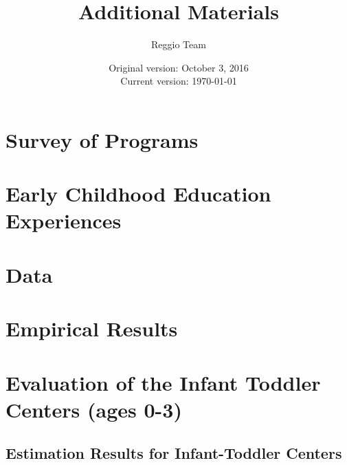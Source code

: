 






\title{\Large \textbf{Additional Materials}}
\author{\normalsize Reggio Team}
\date{\normalsize Original version: October 3, 2016 \\ Current version: \today}
\maketitle

\tableofcontents

\doublespacing

\begin{appendices}

\section{Survey of Programs}
\label{sec:survey}
 

\section{Early Childhood Education Experiences}
\label{sec:eceexperiences}


\section{Data}
\label{sec:data}


\section{Empirical Results}
\label{sec:results}


\section{Evaluation of the Infant Toddler Centers (ages 0-3)} \label{sec:ITC}


\subsection{Estimation Results for Infant-Toddler Centers}
\label{sec:asilo_results}


%

\end{appendices}





